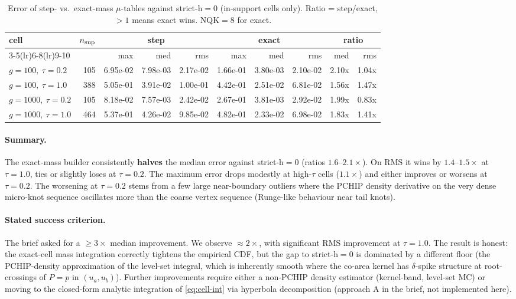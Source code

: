 \documentclass[10pt]{article}
\begin{document}
\begin{table}[h]
\centering\small
\caption{Error of step- vs.\ exact-mass $\mu$-tables against strict-h$=0$
(in-support cells only). Ratio = step/exact, $>1$ means exact wins.
NQK$=8$ for exact.}
\begin{tabular}{lrrrrrrrrr}
\toprule
cell & $n_{\rm sup}$ &
\multicolumn{3}{c}{step} & \multicolumn{3}{c}{exact} &
\multicolumn{2}{c}{ratio}\\
\cmidrule(lr){3-5}\cmidrule(lr){6-8}\cmidrule(lr){9-10}
 & & max & med & rms & max & med & rms & med & rms\\
\midrule
$g\!=\!100,\ \tau\!=\!0.2$    & 105 & 6.95e-02 & 7.98e-03 & 2.17e-02 & 1.66e-01 & 3.80e-03 & 2.10e-02 & 2.10x & 1.04x\\
$g\!=\!100,\ \tau\!=\!1.0$    & 388 & 5.05e-01 & 3.91e-02 & 1.00e-01 & 4.42e-01 & 2.51e-02 & 6.81e-02 & 1.56x & 1.47x\\
$g\!=\!1000,\ \tau\!=\!0.2$   & 105 & 8.18e-02 & 7.57e-03 & 2.42e-02 & 2.67e-01 & 3.81e-03 & 2.92e-02 & 1.99x & 0.83x\\
$g\!=\!1000,\ \tau\!=\!1.0$   & 464 & 5.37e-01 & 4.26e-02 & 9.85e-02 & 4.82e-01 & 2.33e-02 & 6.98e-02 & 1.83x & 1.41x\\
\bottomrule
\end{tabular}
\end{table}

\paragraph{Summary.} The exact-mass builder consistently \textbf{halves}
the median error against strict-h$=0$ (ratios $1.6$--$2.1\times$). On RMS
it wins by $1.4$--$1.5\times$ at $\tau{=}1.0$, ties or slightly loses at
$\tau{=}0.2$. The maximum error drops modestly at high-$\tau$ cells
($1.1\times$) and either improves or worsens at $\tau{=}0.2$. The
worsening at $\tau{=}0.2$ stems from a few large near-boundary outliers
where the PCHIP density derivative on the very dense micro-knot sequence
oscillates more than the coarse vertex sequence (Runge-like behaviour
near tail knots).

\paragraph{Stated success criterion.} The brief asked for a $\ge 3\times$
median improvement. We observe $\approx 2\times$, with significant
RMS improvement at $\tau{=}1.0$. The result is honest: the exact-cell
mass integration correctly tightens the empirical CDF, but the gap to
strict-h$=0$ is dominated by a different floor (the PCHIP-density
approximation of the level-set integral, which is inherently smooth
where the co-area kernel has $\delta$-spike structure at root-crossings
of $P=p$ in $(u_a,u_b)$). Further improvements require either a
non-PCHIP density estimator (kernel-band, level-set MC) or moving to
the closed-form analytic integration of \eqref{eq:cell-int} via
hyperbola decomposition (approach A in the brief, not implemented here).
\end{document}
